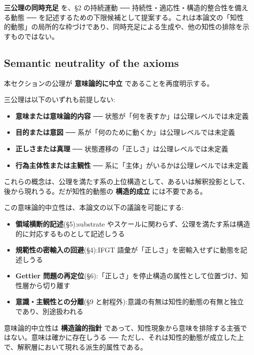 \textbf{三公理の同時充足} を、\S{}2 の持続運動 ── 持続性・適応性・構造的整合性を備える動態 ── を記述するための下限候補として提案する。これは本論文の「知性的動態」の局所的な枠づけであり、同時充足による生成や、他の知性の排除を示すものではない。

\subsection{Semantic neutrality of the axioms}


本セクションの公理が \textbf{意味論的に中立} であることを再度明示する。

三公理は以下のいずれも前提しない:

\begin{itemize}
\item \textbf{意味または意味論的内容} ── 状態が「何を表すか」は公理レベルでは未定義
\item \textbf{目的または意図} ── 系が「何のために動くか」は公理レベルでは未定義
\item \textbf{正しさまたは真理} ── 状態遷移の「正しさ」は公理レベルでは未定義
\item \textbf{行為主体性または主観性} ── 系に「主体」がいるかは公理レベルでは未定義
\end{itemize}

これらの概念は、公理を満たす系の上位構造として、あるいは解釈投影として、後から現れうる。だが知性的動態の \textbf{構造的成立} には不要である。

この意味論的中立性は、本論文の以下の議論を可能にする:

\begin{itemize}
\item \textbf{領域横断的記述}(\S{}5):substrate やスケールに関わらず、公理を満たす系は構造的に対応するものとして記述しうる
\item \textbf{規範性の密輸入の回避}(\S{}4):IFGT 語彙が「正しさ」を密輸入せずに動態を記述しうる
\item \textbf{Gettier 問題の再定位}(\S{}6):「正しさ」を停止構造の属性として位置づけ、知性層から切り離す
\item \textbf{意識・主観性との分離}(\S{}9 と射程外):意識の有無は知性的動態の有無と独立であり、別途扱われる
\end{itemize}

意味論的中立性は \textbf{構造論的指針} であって、知性現象から意味を排除する主張ではない。意味は確かに存在しうる ── ただし、それは知性的動態が成立した上で、解釈層において現れる派生的属性である。

